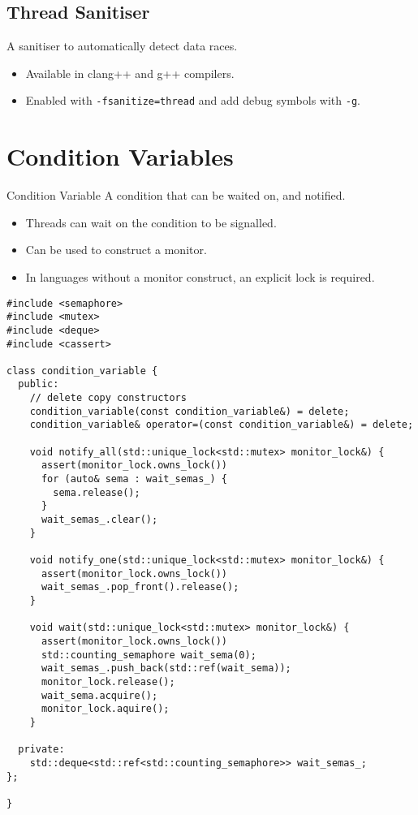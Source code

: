 \subsection{Thread Sanitiser}
A sanitiser to automatically detect data races.
\begin{itemize}
	\item Available in clang++ and g++ compilers.
	\item Enabled with \texttt{-fsanitize=thread} and add debug symbols with \texttt{-g}.
\end{itemize}

\section{Condition Variables}
\begin{definitionbox}{Condition Variable}
	A condition that can be waited on, and notified.
	\begin{itemize}
		\item Threads can wait on the condition to be signalled.
		\item Can be used to construct a monitor.
		\item In languages without a monitor construct, an explicit lock is required.
	\end{itemize}
	\begin{verbatim}
#include <semaphore>
#include <mutex>
#include <deque>
#include <cassert> 

class condition_variable {
  public:
    // delete copy constructors
    condition_variable(const condition_variable&) = delete;
    condition_variable& operator=(const condition_variable&) = delete;

    void notify_all(std::unique_lock<std::mutex> monitor_lock&) {
      assert(monitor_lock.owns_lock())
      for (auto& sema : wait_semas_) {
        sema.release();
      }
      wait_semas_.clear();
    }

    void notify_one(std::unique_lock<std::mutex> monitor_lock&) {
      assert(monitor_lock.owns_lock())
      wait_semas_.pop_front().release();
    }

    void wait(std::unique_lock<std::mutex> monitor_lock&) {
      assert(monitor_lock.owns_lock())
      std::counting_semaphore wait_sema(0);
      wait_semas_.push_back(std::ref(wait_sema));
      monitor_lock.release();
      wait_sema.acquire();
      monitor_lock.aquire();
    }
  
  private:
    std::deque<std::ref<std::counting_semaphore>> wait_semas_;
};

}
  \end{verbatim}
\end{definitionbox}

